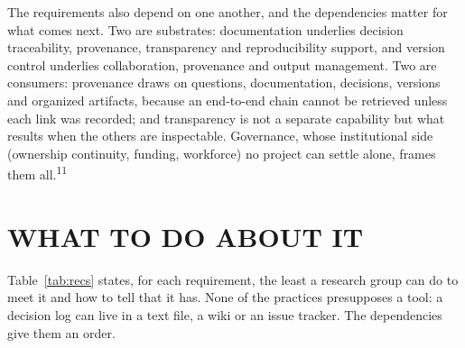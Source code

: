 \documentclass{IEEEcsmag}
\begin{document}
The requirements also depend on one another, and the dependencies matter for what comes next. Two are substrates: documentation underlies decision traceability, provenance, transparency and reproducibility support, and version control underlies collaboration, provenance and output management. Two are consumers: provenance draws on questions, documentation, decisions, versions and organized artifacts, because an end-to-end chain cannot be retrieved unless each link was recorded; and transparency is not a separate capability but what results when the others are inspectable. Governance, whose institutional side (ownership continuity, funding, workforce) no project can settle alone, frames them all.\textsuperscript{11}

\section{WHAT TO DO ABOUT IT}

Table~\ref{tab:recs} states, for each requirement, the least a research group can do to meet it and how to tell that it has. None of the practices presupposes a tool: a decision log can live in a text file, a wiki or an issue tracker. The dependencies give them an order.
\end{document}
